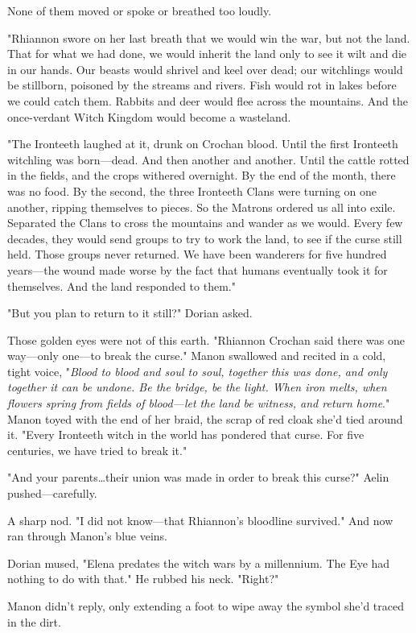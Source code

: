 None of them moved or spoke or breathed too loudly.

"Rhiannon swore on her last breath that we would win the war, but not the land.
That for what we had done, we would inherit the land only to see it wilt and die in our hands.
Our beasts would shrivel and keel over dead; our witchlings would be stillborn, poisoned by the streams and rivers.
Fish would rot in lakes before we could catch them.
Rabbits and deer would flee across the mountains.
And the once-verdant Witch Kingdom would become a wasteland.

"The Ironteeth laughed at it, drunk on Crochan blood.
Until the first Ironteeth witchling was born---dead.
And then another and another.
Until the cattle rotted in the fields, and the crops withered overnight.
By the end of the month, there was no food.
By the second, the three Ironteeth Clans were turning on one another, ripping themselves to pieces.
So the Matrons ordered us all into exile.
Separated the Clans to cross the mountains and wander as we would.
Every few decades, they would send groups to try to work the land, to see if the curse still held.
Those groups never returned.
We have been wanderers for five hundred years---the wound made worse by the fact that humans eventually took it for themselves.
And the land responded to them."

"But you plan to return to it still?"
Dorian asked.

Those golden eyes were not of this earth.
"Rhiannon Crochan said there was one way---only one---to break the curse."
Manon swallowed and recited in a cold, tight voice, "\emph{Blood to blood and soul to soul, together this was done, and only together it can be undone.
Be the bridge, be the light.
When iron melts, when flowers spring from fields of blood---let the land be witness, and return home}."
Manon toyed with the end of her braid, the scrap of red cloak she'd tied around it.
"Every Ironteeth witch in the world has pondered that curse.
For five centuries, we have tried to break it."

"And your parents\ldots their union was made in order to break this curse?"
Aelin pushed---carefully.

A sharp nod.
"I did not know---that Rhiannon's bloodline survived."
And now ran through Manon's blue veins.

Dorian mused, "Elena predates the witch wars by a millennium.
The Eye had nothing to do with that."
He rubbed his neck.
"Right?"

Manon didn't reply, only extending a foot to wipe away the symbol she'd traced in the dirt.

